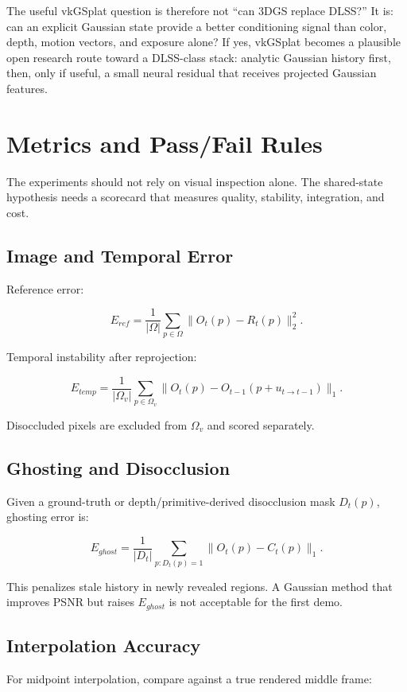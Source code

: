 \documentclass[11pt]{article}
\begin{document}
The useful vkGSplat question is therefore not ``can 3DGS replace DLSS?'' It is:
can an explicit Gaussian state provide a better conditioning signal than color,
depth, motion vectors, and exposure alone? If yes, vkGSplat becomes a plausible
open research route toward a DLSS-class stack: analytic Gaussian history first,
then, only if useful, a small neural residual that receives projected Gaussian
features.

\section{Metrics and Pass/Fail Rules}

The experiments should not rely on visual inspection alone. The shared-state
hypothesis needs a scorecard that measures quality, stability, integration, and
cost.

\subsection{Image and Temporal Error}

Reference error:

\[
  E_{ref} =
  \frac{1}{|\Omega|}
  \sum_{p\in\Omega}
  \|O_t(p)-R_t(p)\|_2^2.
\]

Temporal instability after reprojection:

\[
  E_{temp} =
  \frac{1}{|\Omega_v|}
  \sum_{p\in\Omega_v}
  \|O_t(p)-O_{t-1}(p+u_{t\rightarrow t-1})\|_1.
\]

Disoccluded pixels are excluded from $\Omega_v$ and scored separately.

\subsection{Ghosting and Disocclusion}

Given a ground-truth or depth/primitive-derived disocclusion mask $D_t(p)$,
ghosting error is:

\[
  E_{ghost} =
  \frac{1}{|D_t|}
  \sum_{p:D_t(p)=1}
  \|O_t(p)-C_t(p)\|_1.
\]

This penalizes stale history in newly revealed regions. A Gaussian method that
improves PSNR but raises $E_{ghost}$ is not acceptable for the first demo.

\subsection{Interpolation Accuracy}

For midpoint interpolation, compare against a true rendered middle frame:
\end{document}
